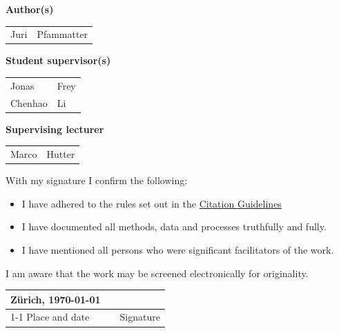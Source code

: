 \textbf{Author(s)}

\vspace{0.5cm}

\begin{tabular}{ p{5cm} p{5cm} }
  Juri & Pfammatter \\
\end{tabular}

\vspace{0.5cm}

\textbf{Student supervisor(s)}

\vspace{0.5cm}

\begin{tabular}{ p{5cm} p{5cm} }
  Jonas   & Frey \\
  Chenhao & Li   \\
\end{tabular}

\vspace{0.5cm}

%
%
%

\textbf{Supervising lecturer}

\vspace{0.5cm}

\begin{tabular}{ p{5cm} p{5cm} }
  Marco & Hutter \\
\end{tabular}

\vspace{0.5cm}

With my signature I confirm the following:
\begin{itemize}
  \item I have adhered to the rules set out in the \href{https://www.ethz.ch/content/dam/ethz/main/education/rechtliches-abschluesse/leistungskontrollen/plagiarism-citationetiquette.pdf}{Citation Guidelines}
  \item I have documented all methods, data and processes truthfully and fully.
  \item I have mentioned all persons who were significant facilitators of the work.
\end{itemize}

\vspace{0.5cm}

I am aware that the work may be screened electronically for originality.

\vspace{2.5cm}

\begin{tabular}{ p{5cm} p{1cm} p{5cm} }
  Zürich, \today &  &           \\
  \cline{1-1} \cline{3-3}
  Place and date &  & Signature \\
\end{tabular}
